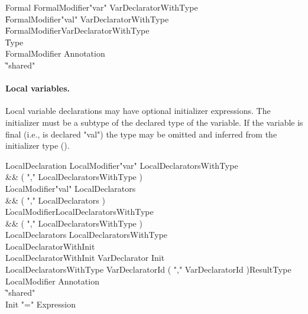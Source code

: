 \begin{grammar}
Formal
        \: FormalModifier\star \xcd"var" VarDeclaratorWithType \\
        \| FormalModifier\star \xcd"val" VarDeclaratorWithType \\
        \| FormalModifier\star VarDeclaratorWithType \\
        \| Type \\
FormalModifier \: Annotation \\
              \| \xcd"shared" \\
\end{grammar}

\paragraph{Local variables.}
Local variable declarations may have optional
initializer expressions.  The initializer must be a subtype of
the declared type of the variable.  If the variable is final
(i.e., is declared \xcd"val")
the type may be omitted and
inferred from the initializer type ().

\begin{grammar}
LocalDeclaration
        \: LocalModifier\star \xcd"var" LocalDeclaratorsWithType \\&& ( \xcd"," LocalDeclaratorsWithType )\star \\
        \| LocalModifier\star \xcd"val" LocalDeclarators \\&& ( \xcd"," LocalDeclarators )\star \\
        \| LocalModifier\star LocalDeclaratorsWithType \\&& ( \xcd"," LocalDeclaratorsWithType )\star \\
LocalDeclarators
        \: LocalDeclaratorsWithType \\
        \: LocalDeclaratorWithInit \\
LocalDeclaratorWithInit
        \: VarDeclarator Init \\
LocalDeclaratorsWithType
        \: VarDeclaratorId
                ( \xcd"," VarDeclaratorId )\star ResultType \\
LocalModifier \: Annotation \\
              \| \xcd"shared" \\
Init \: \xcd"=" Expression \\
\end{grammar}

